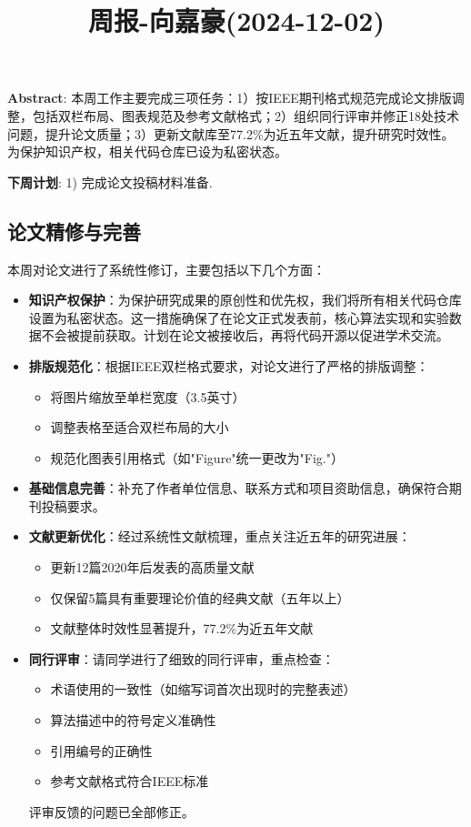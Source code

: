 \documentclass[11pt,a4paper]{article}
\title{周报-向嘉豪(2024-12-02)}
\renewcommand{\maketitle}{
  \begin{center}
    \LARGE\bfseries\thetitle
  \end{center}
}
\begin{document}
\maketitle


\noindent \textbf{Abstract}: 本周工作主要完成三项任务：1）按IEEE期刊格式规范完成论文排版调整，包括双栏布局、图表规范及参考文献格式；2）组织同行评审并修正18处技术问题，提升论文质量；3）更新文献库至77.2\%为近五年文献，提升研究时效性。为保护知识产权，相关代码仓库已设为私密状态。

\noindent \textbf{下周计划}: 1) 完成论文投稿材料准备.

\subsection{论文精修与完善}

本周对论文进行了系统性修订，主要包括以下几个方面：

\begin{itemize}
  \item \textbf{知识产权保护}：为保护研究成果的原创性和优先权，我们将所有相关代码仓库设置为私密状态。这一措施确保了在论文正式发表前，核心算法实现和实验数据不会被提前获取。计划在论文被接收后，再将代码开源以促进学术交流。
  
  \item \textbf{排版规范化}：根据IEEE双栏格式要求，对论文进行了严格的排版调整：
    \begin{itemize}
      \item 将图片缩放至单栏宽度（3.5英寸）
      \item 调整表格至适合双栏布局的大小
      \item 规范化图表引用格式（如"Figure"统一更改为"Fig."）
    \end{itemize}
  
  \item \textbf{基础信息完善}：补充了作者单位信息、联系方式和项目资助信息，确保符合期刊投稿要求。
  
  \item \textbf{文献更新优化}：经过系统性文献梳理，重点关注近五年的研究进展：
    \begin{itemize}
      \item 更新12篇2020年后发表的高质量文献
      \item 仅保留5篇具有重要理论价值的经典文献（五年以上）
      \item 文献整体时效性显著提升，77.2\%为近五年文献
    \end{itemize}
    
  \item \textbf{同行评审}：请同学进行了细致的同行评审，重点检查：
    \begin{itemize}
      \item 术语使用的一致性（如缩写词首次出现时的完整表述）
      \item 算法描述中的符号定义准确性
      \item 引用编号的正确性
      \item 参考文献格式符合IEEE标准
    \end{itemize}
    评审反馈的问题已全部修正。
\end{itemize}






% 
% 
\end{document}
